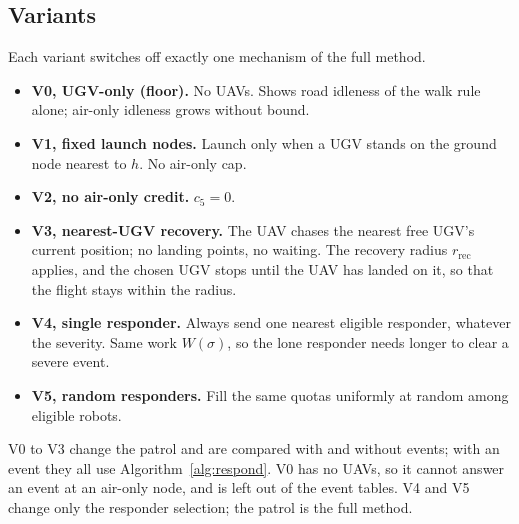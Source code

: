 \documentclass[11pt]{article}
\theoremstyle{definition}
\theoremstyle{plain}
\begin{document}
\subsection{Variants}
Each variant switches off exactly one mechanism of the full method.
\begin{itemize}
\item \textbf{V0, UGV-only (floor).} No UAVs. Shows road idleness of the
walk rule alone; air-only idleness grows without bound.
\item \textbf{V1, fixed launch nodes.} Launch only when a UGV stands on the
ground node nearest to $h$. No air-only cap.
\item \textbf{V2, no air-only credit.} $c_5 = 0$.
\item \textbf{V3, nearest-UGV recovery.} The UAV chases the nearest free
UGV's current position; no landing points, no waiting. The recovery
radius $r_{\mathrm{rec}}$ applies, and the chosen UGV stops until the UAV has landed on
it, so that the flight stays within the radius.
\item \textbf{V4, single responder.} Always send one nearest eligible
responder, whatever the severity. Same work $W(\sigma)$, so the lone
responder needs longer to clear a severe event.
\item \textbf{V5, random responders.} Fill the same quotas uniformly at
random among eligible robots.
\end{itemize}
V0 to V3 change the patrol and are compared with and without events; with
an event they all use Algorithm~\ref{alg:respond}. V0 has no UAVs, so it
cannot answer an event at an air-only node, and is left out of the event
tables. V4 and V5 change only the responder selection; the patrol is the
full method.
\end{document}
